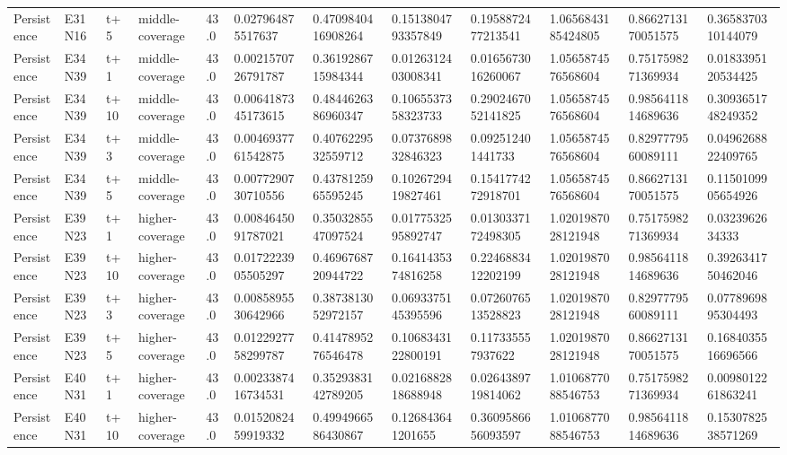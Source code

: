 \begin{landscape}
\begin{longtable}{llllllllllll}
Persistence & E31N16 & t+5 & middle-coverage & 43.0 & 0.027964875517637 & 0.4709840416908264 & 0.1513804793357849 & 0.1958872477213541 & 1.0656843185424805 & 0.8662713170051575 & 0.3658370310144079 \\
Persistence & E34N39 & t+1 & middle-coverage & 43.0 & 0.0021570726791787 & 0.3619286715984344 & 0.0126312403008341 & 0.0165673016260067 & 1.0565874576568604 & 0.7517598271369934 & 0.0183395120534425 \\
Persistence & E34N39 & t+10 & middle-coverage & 43.0 & 0.0064187345173615 & 0.4844626386960347 & 0.1065537358323733 & 0.2902467052141825 & 1.0565874576568604 & 0.9856411814689636 & 0.3093651748249352 \\
Persistence & E34N39 & t+3 & middle-coverage & 43.0 & 0.0046937761542875 & 0.4076229532559712 & 0.0737689832846323 & 0.092512401441733 & 1.0565874576568604 & 0.8297779560089111 & 0.0496268822409765 \\
Persistence & E34N39 & t+5 & middle-coverage & 43.0 & 0.0077290730710556 & 0.4378125965595245 & 0.1026729419827461 & 0.1541774272918701 & 1.0565874576568604 & 0.8662713170051575 & 0.1150109905654926 \\
Persistence & E39N23 & t+1 & higher-coverage & 43.0 & 0.0084645091787021 & 0.3503285547097524 & 0.0177532595892747 & 0.0130337172498305 & 1.0201987028121948 & 0.7517598271369934 & 0.0323962634333 \\
Persistence & E39N23 & t+10 & higher-coverage & 43.0 & 0.0172223905505297 & 0.4696768720944722 & 0.1641435374816258 & 0.2246883412202199 & 1.0201987028121948 & 0.9856411814689636 & 0.3926341750462046 \\
Persistence & E39N23 & t+3 & higher-coverage & 43.0 & 0.0085895530642966 & 0.3873813052972157 & 0.0693375145395596 & 0.0726076513528823 & 1.0201987028121948 & 0.8297779560089111 & 0.0778969895304493 \\
Persistence & E39N23 & t+5 & higher-coverage & 43.0 & 0.0122927758299787 & 0.4147895276546478 & 0.1068343122800191 & 0.117335557937622 & 1.0201987028121948 & 0.8662713170051575 & 0.1684035516696566 \\
Persistence & E40N31 & t+1 & higher-coverage & 43.0 & 0.0023387416734531 & 0.3529383142789205 & 0.0216882818688948 & 0.0264389719814062 & 1.0106877088546753 & 0.7517598271369934 & 0.0098012261863241 \\
Persistence & E40N31 & t+10 & higher-coverage & 43.0 & 0.0152082459919332 & 0.4994966586430867 & 0.126843641201655 & 0.3609586656093597 & 1.0106877088546753 & 0.9856411814689636 & 0.1530782538571269 \\

\end{longtable}
\end{landscape}
